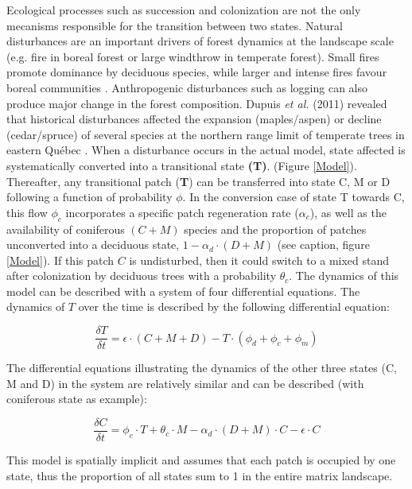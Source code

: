 Ecological processes
such as succession and colonization are not the only mecanisms responsible for
the transition between two states. Natural disturbances are an important
drivers of forest dynamics at the landscape scale (e.g. fire in boreal forest
or large windthrow in temperate forest). Small fires promote dominance by
deciduous species, while larger and intense fires favour boreal communities
\cite{Bergeron2004}. Anthropogenic disturbances such as logging can also
produce major change in the forest composition. Dupuis \textit{et al.} (2011)
revealed that historical disturbances affected the  expansion (maples/aspen)
or decline (cedar/spruce) of several species at the northern range limit of
temperate trees in eastern Québec \cite{Dupuis2011}. When a disturbance occurs
in the actual model, state affected is systematically converted into a
transitional state \textbf{(T)}. (Figure \ref{Model}).  Thereafter, any
transitional patch (\textbf{T}) can be transferred into state C, M or D
following a function of probability $\phi$. In the conversion case of state T
towards C, this flow $\phi_c$ incorporates a specific patch regeneration rate
($\alpha_c$), as well as the availability of coniferous $(C + M)$ species and
the proportion of patches unconverted into a deciduous state, $1- \alpha_d
\cdot (D + M)$ (see caption, figure \ref{Model}). If this patch $C$ is
undisturbed, then it could switch to a mixed stand after colonization by
deciduous trees with a probability $\theta_c$. The dynamics of this model can
be described with a system of four differential equations.  The dynamics of
$T$ over the time is described by the following differential equation:

\begin{equation}
 	\frac{\delta T}{\delta t} =\epsilon \cdot (C+M+D) - T \cdot (\phi_d + \phi_c + \phi_m)
\end{equation}

The differential equations illustrating the dynamics of the other three states
(C, M and D) in the system are relatively similar and can be described (with
coniferous state as example):

\begin{equation}
	\frac{\delta C}{\delta t} = \phi_c \cdot T + \theta_c \cdot M -\alpha_d \cdot (D+M)\cdot C - \epsilon \cdot C
\end{equation}

This model is spatially implicit and assumes that each patch is occupied by
one state, thus the proportion of all states sum to 1 in the entire matrix
landscape. \\


